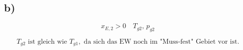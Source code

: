 

\subsection*{b)}

\[
x_{E,2} > 0 \quad T_{g2}, \, p_{g2}
\]

\[
T_{g2} \text{ ist gleich wie } T_{g1}, \text{ da sich das EW noch im "Muss-fest" Gebiet vor ist.}
\]